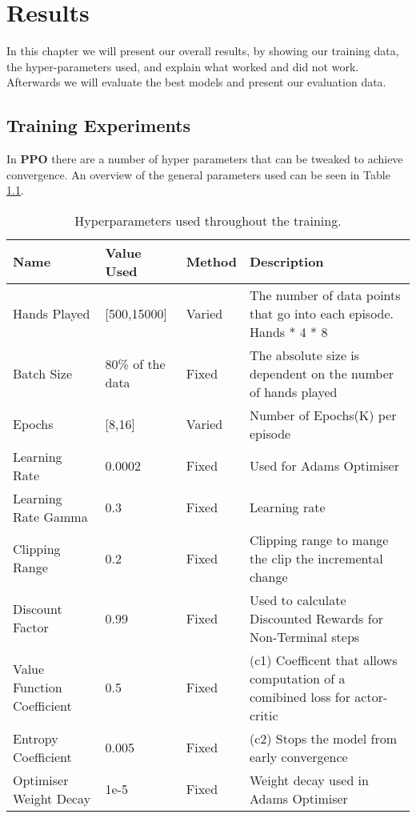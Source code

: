 \chapter{Results}
In this chapter we will present our overall results, by showing our training data, the hyper-parameters used, and
explain what worked and did not work.
Afterwards we will evaluate the best models and present our evaluation data.
\section{Training Experiments}
In \textbf{PPO} there are a number of hyper parameters that can be tweaked to achieve convergence.
An overview of the general parameters used can be seen in Table \ref{tab:hyper}.
\begin{table}[!ht]
    \begin{tabularx}{\linewidth}{lllX}
        \toprule
        Name & Value Used & Method & Description
        \\
        \midrule
        Hands Played & {[}500,15000{]} & Varied & The number of data points that go into each
        episode. Hands * 4 * 8 \\
        Batch Size & 80\% of the data & Fixed & The absolute size is dependent on the number of
        hands played \\
        Epochs & {[}8,16{]} & Varied & Number of Epochs(K) per episode
        \\
        Learning Rate & 0.0002 & Fixed & Used for Adams Optimiser
        \\
        Learning Rate Gamma & 0.3 & Fixed & Learning rate
        \\
        Clipping Range & 0.2 & Fixed & Clipping range to mange the clip the incremental
        change \\
        Discount Factor & 0.99 & Fixed & Used to calculate Discounted Rewards for
        Non-Terminal steps \\
        Value Function Coefficient & 0.5 & Fixed & (c1) Coefficent that allows computation of a
        comibined loss for actor-critic \\
        Entropy Coefficient        & 0.005            & Fixed  & (c2) Stops the model from early convergence
        \\
        Optimiser Weight Decay     & 1e-5             & Fixed  & Weight decay used in Adams Optimiser
        \\
        \bottomrule
    \end{tabularx}
    \caption{Hyperparameters used throughout the training.}
    \label{tab:hyper}
\end{table}

